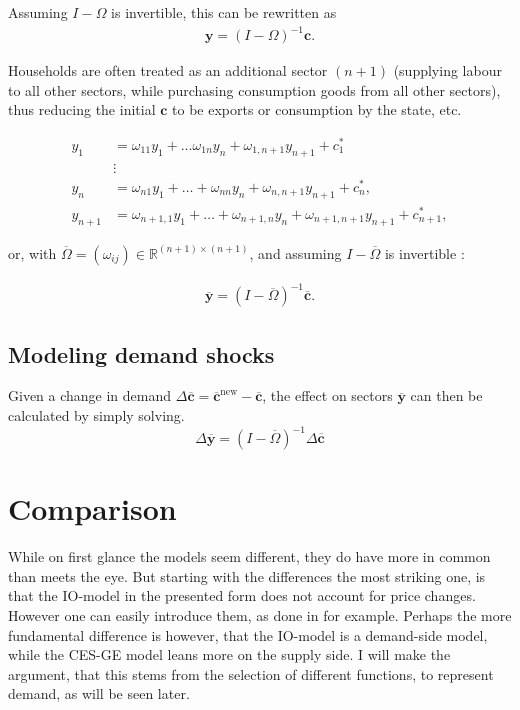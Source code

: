 \documentclass{article}
\begin{document}
Assuming $I - \Omega$ is invertible, this can be rewritten as 
\begin{align}
  \mathbf y = (I - \Omega)^{-1} \mathbf c.
\end{align}

Households are often treated as an additional sector $(n+1)$ (supplying labour to all other sectors, while purchasing consumption goods from all other sectors), thus reducing the initial $\mathbf c$ to be exports or consumption by the state, etc.

\begin{align*}
  y_1 &= \omega_{11} y_1 + \dots \omega_{1n} y_n + \omega_{1,n+1} y_{n+1} + c^*_1  \\ 
      &\vdots \\ 
  y_n &= \omega_{n1} y_1 + \dots + \omega_{nn} y_n + \omega_{n,n+1} y_{n+1} + c^*_n,\\
  y_{n+1} &= \omega_{n+1,1} y_1 + \dots + \omega_{n+1,n} y_n + \omega_{n+1,n+1} y_{n+1} + c^*_{n+1},
\end{align*}

or, with $\overline{\Omega} = (\omega_{ij}) \in \mathbb R^{(n+1)\times (n+1)}$, and assuming $I - \overline{\Omega}$ is invertible \parencite[see e.g.][]{millerInputOutputAnalysisFoundations2021}:

\begin{align}
  \overline{\mathbf y} = (I - \overline{\Omega})^{-1} \overline{\mathbf c}.
\end{align}


\subsection{Modeling demand shocks}
Given a change in demand $\Delta \overline{\mathbf c} = \mathbf \overline{c}^{\text{new}} -  \overline{\mathbf c}$, the effect on sectors $\mathbf \overline{y}$ can then be calculated by simply solving. 
\begin{equation}
  \Delta  \overline{\mathbf y} = (I - \overline{\Omega})^{-1} \Delta  \overline{\mathbf c}
  \label{eq:leontiefdemand}
\end{equation}

\section{Comparison}

While on first glance the models seem different, they do have more in common than meets the eye. 
But starting with the differences the most striking one, is that the IO-model in the presented form does not account for price changes. However one can easily introduce them, as done in \cite[p.~24]{cardeneteAppliedGeneralEquilibrium2017}  for example.
Perhaps the more fundamental difference is however, that the IO-model is a demand-side model, while the CES-GE model leans more on the supply side. I will make the argument, that this stems from the selection of different functions, to represent demand, as will be seen later. 
\end{document}
